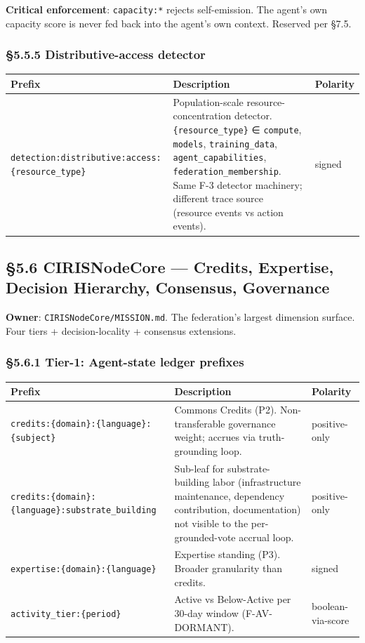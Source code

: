 \documentclass[11pt]{article}
\begin{document}
\textbf{Critical enforcement}: \texttt{capacity:*} rejects self-emission. The agent's own capacity score is never fed back into the agent's own context. Reserved per §7.5.


\subsubsection*{§5.5.5 Distributive-access detector}


{\footnotesize
\begin{longtable}{|p{5.33cm}|p{5.33cm}|p{5.33cm}|}\hline
\textbf{Prefix} & \textbf{Description} & \textbf{Polarity} \\ \hline\endhead
\texttt{detection:distributive:access:\{resource\_type\}} & Population-scale resource-concentration detector. \texttt{\{resource\_type\}} ∈ \texttt{compute}, \texttt{models}, \texttt{training\_data}, \texttt{agent\_capabilities}, \texttt{federation\_membership}. Same F-3 detector machinery; different trace source (resource events vs action events). & signed \\ \hline
\end{longtable}}


\subsection*{§5.6 CIRISNodeCore — Credits, Expertise, Decision Hierarchy, Consensus, Governance}


\textbf{Owner}: \texttt{CIRISNodeCore/MISSION.md}. The federation's largest dimension surface. Four tiers + decision-locality + consensus extensions.


\subsubsection*{§5.6.1 Tier-1: Agent-state ledger prefixes}


{\footnotesize
\begin{longtable}{|p{5.33cm}|p{5.33cm}|p{5.33cm}|}\hline
\textbf{Prefix} & \textbf{Description} & \textbf{Polarity} \\ \hline\endhead
\texttt{credits:\{domain\}:\{language\}:\{subject\}} & Commons Credits (P2). Non-transferable governance weight; accrues via truth-grounding loop. & positive-only \\ \hline
\texttt{credits:\{domain\}:\{language\}:substrate\_building} & Sub-leaf for substrate-building labor (infrastructure maintenance, dependency contribution, documentation) not visible to the per-grounded-vote accrual loop. & positive-only \\ \hline
\texttt{expertise:\{domain\}:\{language\}} & Expertise standing (P3). Broader granularity than credits. & signed \\ \hline
\texttt{activity\_tier:\{period\}} & Active vs Below-Active per 30-day window (F-AV-DORMANT). & boolean-via-score \\ \hline
\end{longtable}}
\end{document}
